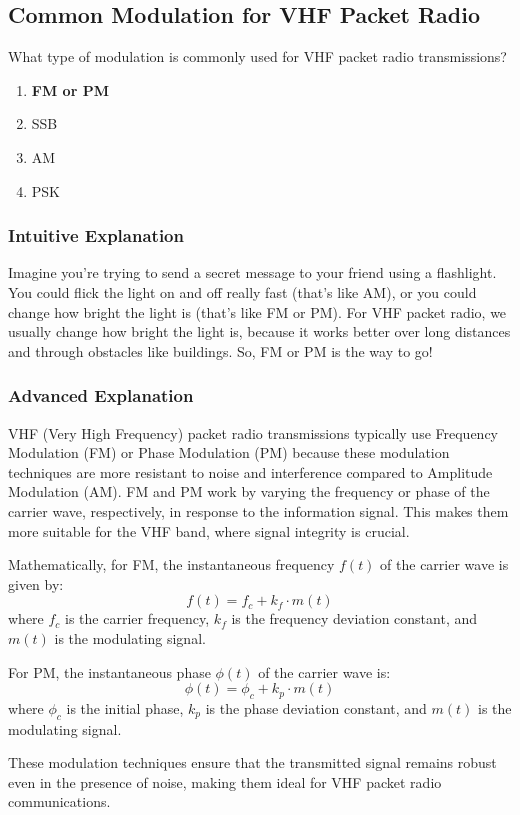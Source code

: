 \subsection{Common Modulation for VHF Packet Radio}
\label{T8A02}

\begin{tcolorbox}[colback=gray!10!white,colframe=black!75!black,title=T8A02]
What type of modulation is commonly used for VHF packet radio transmissions?
\begin{enumerate}[label=\Alph*)]
    \item \textbf{FM or PM}
    \item SSB
    \item AM
    \item PSK
\end{enumerate}
\end{tcolorbox}

\subsubsection*{Intuitive Explanation}
Imagine you're trying to send a secret message to your friend using a flashlight. You could flick the light on and off really fast (that's like AM), or you could change how bright the light is (that's like FM or PM). For VHF packet radio, we usually change how bright the light is, because it works better over long distances and through obstacles like buildings. So, FM or PM is the way to go!

\subsubsection*{Advanced Explanation}
VHF (Very High Frequency) packet radio transmissions typically use Frequency Modulation (FM) or Phase Modulation (PM) because these modulation techniques are more resistant to noise and interference compared to Amplitude Modulation (AM). FM and PM work by varying the frequency or phase of the carrier wave, respectively, in response to the information signal. This makes them more suitable for the VHF band, where signal integrity is crucial.

Mathematically, for FM, the instantaneous frequency \( f(t) \) of the carrier wave is given by:
\[ f(t) = f_c + k_f \cdot m(t) \]
where \( f_c \) is the carrier frequency, \( k_f \) is the frequency deviation constant, and \( m(t) \) is the modulating signal.

For PM, the instantaneous phase \( \phi(t) \) of the carrier wave is:
\[ \phi(t) = \phi_c + k_p \cdot m(t) \]
where \( \phi_c \) is the initial phase, \( k_p \) is the phase deviation constant, and \( m(t) \) is the modulating signal.

These modulation techniques ensure that the transmitted signal remains robust even in the presence of noise, making them ideal for VHF packet radio communications.

